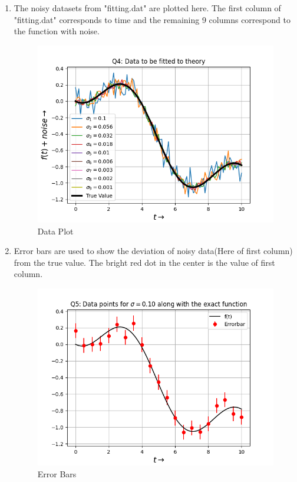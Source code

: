 \documentclass[12pt, a4paper]{report}
\begin{document}
\begin{enumerate}
    \item The noisy datasets from "fitting.dat" are plotted here. The first column of "fitting.dat" corresponds to time and the remaining 9 columns
correspond to the function with noise.
    \begin{figure}[H]
        \centering
        \includegraphics[scale = 0.76]{Figure_0.png}
        \caption{Data Plot}
        \label{fig:sample}
    \end{figure}

    \item Error bars are used to show the deviation of noisy data(Here of first column)
from the true value. The bright red dot in the center is the value of first column.
    \begin{figure}[H]
        \centering
        \includegraphics[scale = 0.735]{Figure_1.png}
        \caption{Error Bars}
        \label{fig:sample}
    \end{figure}


\end{enumerate}
\end{document}
